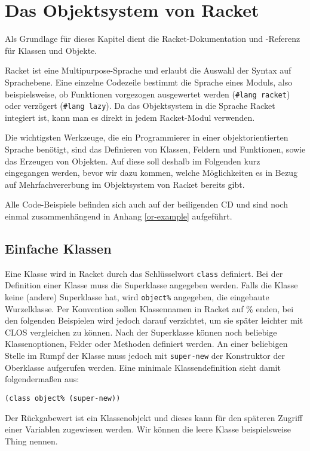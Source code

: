 \section{Das Objektsystem von Racket}
Als Grundlage für dieses Kapitel dient die Racket-Dokumentation \cite{racketguide-classes} und -Referenz \cite{racketref-classes} für Klassen und Objekte.

Racket ist eine Multipurpose-Sprache und erlaubt die Auswahl der Syntax auf Sprachebene. Eine einzelne Codezeile bestimmt die Sprache eines Moduls, also beispielsweise, ob Funktionen vorgezogen ausgewertet werden (\texttt{\#lang racket}) oder verzögert (\texttt{\#lang lazy}). Da das Objektsystem in die Sprache Racket integiert ist, kann man es direkt in jedem Racket-Modul verwenden.

Die wichtigsten Werkzeuge, die ein Programmierer in einer objektorientierten Sprache benötigt, sind das Definieren von Klassen, Feldern und Funktionen, sowie das Erzeugen von Objekten. Auf diese soll deshalb im Folgenden kurz eingegangen werden, bevor wir dazu kommen, welche Möglichkeiten es in Bezug auf Mehrfachvererbung im Objektsystem von Racket bereits gibt.

Alle Code-Beispiele befinden sich auch auf der beiligenden CD und sind noch einmal zusammenhängend in Anhang \ref{or-example} aufgeführt. 

\subsection{Einfache Klassen}

Eine Klasse wird in Racket durch das Schlüsselwort \texttt{class} definiert. Bei der Definition einer Klasse muss die Superklasse angegeben werden. Falls die Klasse keine (andere) Superklasse hat, wird \texttt{object\%} angegeben, die eingebaute Wurzelklasse. Per Konvention sollen Klassennamen in Racket auf \% enden, bei den folgenden Beispielen wird jedoch darauf verzichtet, um sie später leichter mit CLOS vergleichen zu können. Nach der Superklasse können noch beliebige Klassenoptionen, Felder oder Methoden definiert werden. An einer beliebigen Stelle im Rumpf der Klasse muss jedoch mit \texttt{super-new} der Konstruktor der Oberklasse aufgerufen werden. Eine minimale Klassendefinition sieht damit folgendermaßen aus:

\begin{lstlisting}
(class object% (super-new))
\end{lstlisting}

Der Rückgabewert ist ein Klassenobjekt und dieses kann für den späteren Zugriff einer Variablen zugewiesen werden. Wir können die leere Klasse beispielsweise Thing nennen.

